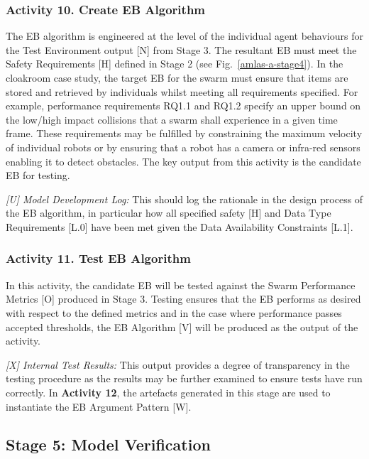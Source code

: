 \documentclass[runningheads]{llncs}
\begin{document}
\vspace{-2ex}
\subsubsection*{Activity 10. Create EB Algorithm}

The EB algorithm is engineered at the level of the individual agent behaviours for the Test Environment output [N] from Stage 3. The resultant EB must meet the Safety Requirements [H] defined in Stage 2 (see Fig.~\ref{amlas-a-stage4}). 
In the cloakroom case study, the target EB for the swarm must ensure that items are stored and retrieved by individuals whilst meeting all requirements specified. For example, performance requirements RQ1.1 and RQ1.2 specify an upper bound on the low/high impact collisions that a swarm shall experience in a given time frame. These requirements may be fulfilled by constraining the maximum velocity of individual robots or by ensuring that a robot has a camera or infra-red sensors enabling it to detect obstacles. The key output from this activity is the candidate EB for testing.

\emph{[U] Model Development Log:} This should log the rationale in the design process of the EB algorithm, in particular how all specified safety [H] and Data Type Requirements [L.0] have been met given the Data Availability Constraints [L.1].

\vspace{-2ex}
\subsubsection*{Activity 11. Test EB Algorithm}

In this activity, the candidate EB will be tested against the Swarm Performance Metrics [O] produced in Stage 3. Testing ensures that the EB performs as desired with respect to the defined metrics and in the case where performance passes accepted thresholds, the EB Algorithm [V] will be produced as the output of the activity. 

\emph{[X] Internal Test Results:} This output provides a degree of transparency in the testing procedure as the results may be further examined to ensure tests have run correctly. 
In \textbf{Activity 12}, the artefacts generated in this stage are used to instantiate the EB Argument Pattern [W].

\vspace{-2ex}
\subsection{Stage 5: Model Verification} \label{framework-stage5}
\end{document}
